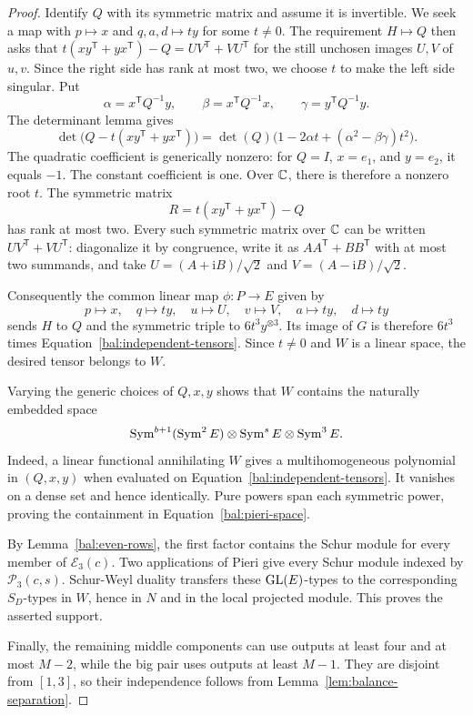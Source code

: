 \begin{proof}
Identify $Q$ with its symmetric matrix and assume it is invertible.
We seek a map with $p\mapsto x$ and $q,a,d\mapsto ty$ for some
$t\ne0$. The requirement $H\mapsto Q$ then asks that
$t(xy^{\mathsf T}+yx^{\mathsf T})-Q=UV^{\mathsf T}+VU^{\mathsf T}$
for the still unchosen images $U,V$ of $u,v$. Since the right side
has rank at most two, we choose $t$ to make the left side singular.
Put
\[
 \alpha=x^{\mathsf T}Q^{-1}y,
 \qquad \beta=x^{\mathsf T}Q^{-1}x,
 \qquad \gamma=y^{\mathsf T}Q^{-1}y.
\]
The determinant lemma gives
\begin{equation}
 \det\bigl(Q-t(xy^{\mathsf T}+yx^{\mathsf T})\bigr)
   =\det(Q)\bigl(1-2\alpha t+
                         (\alpha^2-\beta\gamma)t^2\bigr).
 \label{bal:density-determinant}
\end{equation}
The quadratic coefficient is generically nonzero: for $Q=I$,
$x=e_1$, and $y=e_2$, it equals $-1$. The constant coefficient
is one. Over $\mathbb C$, there is therefore a
nonzero root $t$.  The symmetric matrix
\[
 R=t(xy^{\mathsf T}+yx^{\mathsf T})-Q
\]
has rank at most two.  Every such symmetric matrix over $\mathbb C$
can be written $UV^{\mathsf T}+VU^{\mathsf T}$: diagonalize it
by congruence, write it as $AA^{\mathsf T}+BB^{\mathsf T}$
with at most two summands, and take
$U=(A+\mathrm i B)/\sqrt2$ and
$V=(A-\mathrm i B)/\sqrt2$.

Consequently the common linear map $\phi:P\to E$ given by
\begin{equation}
 p\longmapsto x,\quad q\longmapsto ty,\quad
 u\longmapsto U,\quad v\longmapsto V,\quad
 a\longmapsto ty,\quad d\longmapsto ty
 \label{bal:density-map}
\end{equation}
sends $H$ to $Q$ and the symmetric triple to
$6t^3y^{\otimes3}$. Its image of $G$ is therefore $6t^3$ times
Equation~\eqref{bal:independent-tensors}. Since $t\ne0$ and $W$
is a linear space, the desired tensor belongs to $W$.

Varying the generic choices of $Q,x,y$ shows that $W$ contains
the naturally embedded space
\begin{equation}
 \operatorname{Sym}^{b+1}(\operatorname{Sym}^2 E)\otimes\operatorname{Sym}^s E\otimes\operatorname{Sym}^3 E.
 \label{bal:pieri-space}
\end{equation}
Indeed, a linear functional annihilating $W$ gives a
multihomogeneous polynomial in $(Q,x,y)$ when evaluated on
Equation~\eqref{bal:independent-tensors}.  It vanishes on a dense
set and hence identically.  Pure powers span each symmetric
power, proving the containment in
Equation~\eqref{bal:pieri-space}.

By Lemma~\ref{bal:even-rows}, the first factor contains the
Schur module for every member of $\mathcal E_3(c)$.  Two
applications of Pieri give every Schur module indexed by
$\mathcal P_3(c,s)$.  Schur-Weyl duality transfers these
$\operatorname{GL}(E)$-types to the corresponding $S_D$-types in $W$, hence
in $N$ and in the local projected module.  This proves the
asserted support.

Finally, the remaining middle components can use outputs at least
four and at most $M-2$, while the big pair uses outputs at least
$M-1$.  They are disjoint from $[1,3]$, so their independence
follows from Lemma~\ref{lem:balance-separation}.
\end{proof}

